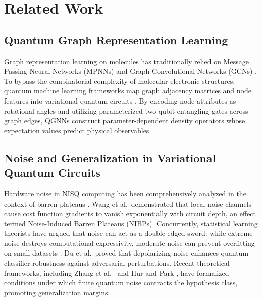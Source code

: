 \documentclass[sn-apacite,Numbered]{sn-jnl}
\begin{document}
\section{Related Work}\label{sec:related_work}

\subsection{Quantum Graph Representation Learning}
Graph representation learning on molecules has traditionally relied on Message Passing Neural Networks (MPNNs) and Graph Convolutional Networks (GCNs) \cite{kipf2017semi,brasoveanu2023extending}. To bypass the combinatorial complexity of molecular electronic structures, quantum machine learning frameworks map graph adjacency matrices and node features into variational quantum circuits \cite{beer2020training,deocarizborde2022graph}. By encoding node attributes as rotational angles and utilizing parameterized two-qubit entangling gates across graph edges, QGNNs construct parameter-dependent density operators whose expectation values predict physical observables.

\subsection{Noise and Generalization in Variational Quantum Circuits}
Hardware noise in NISQ computing has been comprehensively analyzed in the context of barren plateaus \cite{mcclean2018barren,wang2021noise}. Wang et al.\ demonstrated that local noise channels cause cost function gradients to vanish exponentially with circuit depth, an effect termed Noise-Induced Barren Plateaus (NIBPs). Concurrently, statistical learning theorists have argued that noise can act as a double-edged sword: while extreme noise destroys computational expressivity, moderate noise can prevent overfitting on small datasets \cite{du2021quantum,gilfuster2024understanding}. Du et al.\ proved that depolarizing noise enhances quantum classifier robustness against adversarial perturbations. Recent theoretical frameworks, including Zhang et al.\ \cite{zhang2026theory} and Hur and Park \cite{hur2024understanding}, have formalized conditions under which finite quantum noise contracts the hypothesis class, promoting generalization margins.
\end{document}
